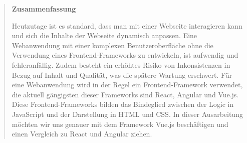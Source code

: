 \documentclass[%
	BCOR=8.25mm,         %
	DIV=12,              %
	parskip=half,				 %
	bibliography=totoc,	 %
	headsepline=on,      %
	]{scrbook}
\begin{document}
\pagestyle{empty}
\begin{quote}
	\vspace*{4cm}

	\begin{center}
		\textbf{\Large\sffamily Zusammenfassung}
	\end{center}
	Heutzutage ist es standard, dass man mit einer Webseite interagieren kann und sich die Inhalte der Webseite dynamisch anpassen.
	Eine Webanwendung mit einer komplexen Benutzeroberfläche ohne die Verwendung eines Frontend-Frameworks zu entwickeln, ist aufwendig und fehleranfällig.
	Zudem besteht ein erhöhtes Risiko von Inkonsistenzen in Bezug auf Inhalt und Qualität, was die spätere Wartung erschwert.
	Für eine Webanwendung wird in der Regel ein Frontend-Framework verwendet, die aktuell gängigsten dieser Frameworks sind React, Angular und Vue.js.
	Diese Frontend-Frameworks bilden das Bindeglied zwischen der Logic in JavaScript und der Darstellung in HTML und CSS.
	In dieser Ausarbeitung möchten wir uns genauer mit dem Framework Vue.js beschäftigen und einen Vergleich zu React und Angular ziehen.

	
\end{quote}
\cleardoubleemptypage

\tableofcontents

\listoffigures
\listoftables
\lstlistoflistings

\mainmatter 
\pagestyle{headings}

%
%
%

\backmatter 

\appendix
%

\end{document}
